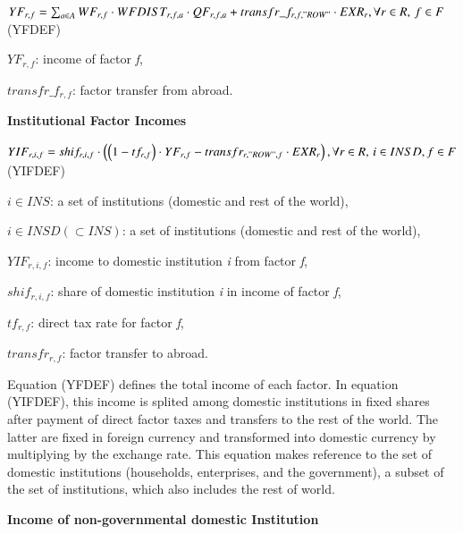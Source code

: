 \documentclass[10pt,a4paper,titlepage,dvipdfmx]{book}
\begin{document}
\begin{center}$YF_{r,f}=\sum _{a\in A}WF_{r,f}\cdot WFDIST_{r,f,a}\cdot QF_{r,f,a}+transfr\_ f_{r,f,"ROW"}\cdot EXR_{r} ,\forall r\in R,\,f\in F$ (YFDEF)
\end{center}

\begin{flushleft}
$YF_{r,f}$: income of factor \textit{f},

$transfr\_f_{r,f}$: factor transfer from abroad.
\end{flushleft}

\begin{flushleft}\textbf{Institutional Factor Incomes}\end{flushleft}


\begin{center}  $YIF_{r,i,f}=shif_{r,i,f}\cdot \left(\left(1-tf_{r,f}\right)\cdot YF_{r,f}-transfr_{r,"ROW",f}\cdot EXR_{r}\right),\forall r\in R,\,i\in INSD,f\in F$ (YIFDEF)
\end{center}

\begin{flushleft}
$i\in INS$: a set of institutions (domestic and rest of the world),

$i\in INSD\left(\subset INS\right)$: a set of institutions (domestic and rest of the world),

$YIF_{r,i,f}$: income to domestic institution \textit{i} from factor \textit{f},

$shif_{r,i,f}$: share of domestic institution \textit{i} in income of factor \textit{f},

$tf_{r,f}$: direct tax rate for factor \textit{f},

$transfr_{r,f}$: factor transfer to abroad.
\end{flushleft}

Equation (YFDEF) defines the total income of each factor. In equation (YIFDEF), this income is splited among domestic institutions in fixed shares after payment of direct factor taxes and transfers to the rest of the world. The latter are fixed in foreign currency and transformed into domestic currency by multiplying by the exchange rate. This equation makes reference to the set of domestic institutions (households, enterprises, and the government), a subset of the set of institutions, which also includes the rest of world.

\begin{flushleft}\textbf{Income of non-governmental domestic Institution}\end{flushleft}
\end{document}
